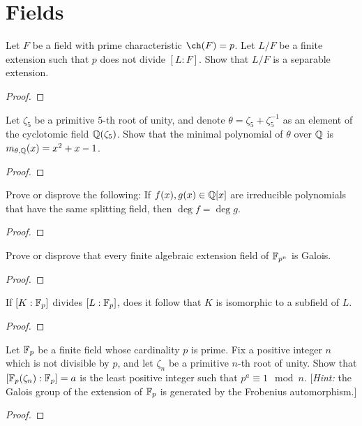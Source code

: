 \section{Fields}
\begin{problem}
Let $F$ be a field with prime characteristic $\ch(F)=p$. Let $L/F$ be a
finite extension such that $p$ does not divide $[L:F]$. Show that $L/F$ is
a separable extension.
\begin{proof}
\end{proof}
\end{problem}

\begin{problem}
Let $\zeta_5$ be a primitive $5$-th root of unity, and denote
$\theta=\zeta_5+\zeta_5^{-1}$ as an element of the cyclotomic field
$\mathbb{Q}(\zeta_5)$. Show that the minimal polynomial of $\theta$ over $\mathbb{Q}$
is $m_{\theta,\mathbb{Q}}(x)=x^2+x-1$.
\begin{proof}
\end{proof}
\end{problem}

\begin{problem}
Prove or disprove the following: If $f(x),g(x)\in\mathbb{Q}[x]$ are irreducible
polynomials that have the same splitting field, then $\deg f=\deg g$.
\begin{proof}
\end{proof}
\end{problem}

\begin{problem}
Prove or disprove that every finite algebraic extension field of
$\mathbb{F}_{p^n}$ is Galois.
\begin{proof}
\end{proof}
\end{problem}

\begin{problem}
If $[K:\mathbb{F}_p]$ divides $[L:\mathbb{F}_p]$, does it follow that $K$ is isomorphic
to a subfield of $L$.
\begin{proof}
\end{proof}
\end{problem}

\begin{problem}
Let $\mathbb{F}_p$ be a finite field whose cardinality $p$ is prime. Fix a
positive integer $n$ which is not divisible by $p$, and let $\zeta_n$ be a
primitive $n$-th root of unity. Show that $[\mathbb{F}_p(\zeta_n):\mathbb{F}_p]=a$ is
the least positive integer such that $p^a\equiv 1\mod n$. [\emph{Hint:} the
Galois group of the extension of $\mathbb{F}_p$ is generated by the Frobenius
automorphism.]
\begin{proof}

\end{proof}
\end{problem}

